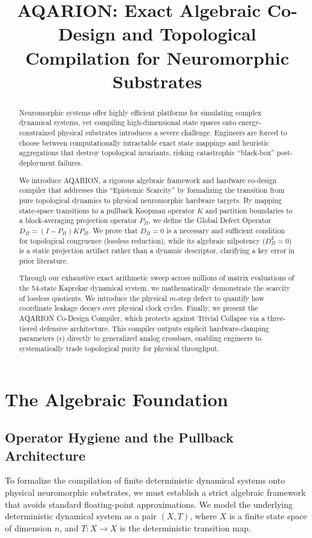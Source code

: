 \documentclass[10pt, conference]{IEEEtran}
\title{AQARION: Exact Algebraic Co-Design and Topological Compilation for Neuromorphic Substrates}
\author{
    \IEEEauthorblockN{Anonymous Authors}
    \IEEEauthorblockA{Submission to Neuromorphic Computing and Engineering (NCE)\\
    Artifact DOI: \href{https://doi.org/\aqarionDOI}{\aqarionDOI} | Verification: \aqarionLeanStatus}
}
\begin{document}
\maketitle

\begin{abstract}
Neuromorphic systems offer highly efficient platforms for simulating complex dynamical systems, yet compiling high-dimensional state spaces onto energy-constrained physical substrates introduces a severe challenge. Engineers are forced to choose between computationally intractable exact state mappings and heuristic aggregations that destroy topological invariants, risking catastrophic ``black-box'' post-deployment failures.

We introduce AQARION, a rigorous algebraic framework and hardware co-design compiler that addresses this ``Epistemic Scarcity'' by formalizing the transition from pure topological dynamics to physical neuromorphic hardware targets. By mapping state-space transitions to a pullback Koopman operator $K$ and partition boundaries to a block-averaging projection operator $P_\Pi$, we define the Global Defect Operator $D_\Pi = (I - P_\Pi) K P_\Pi$. We prove that $D_\Pi = 0$ is a necessary and sufficient condition for topological congruence (lossless reduction), while its algebraic nilpotency ($D_\Pi^2 = 0$) is a static projection artifact rather than a dynamic descriptor, clarifying a key error in prior literature.

Through our exhaustive exact arithmetic sweep across millions of matrix evaluations of the 54-state Kaprekar dynamical system, we mathematically demonstrate the scarcity of lossless quotients. We introduce the physical $m$-step defect to quantify how coordinate leakage decays over physical clock cycles. Finally, we present the AQARION Co-Design Compiler, which protects against Trivial Collapse via a three-tiered defensive architecture. This compiler outputs explicit hardware-clamping parameters ($\epsilon$) directly to generalized analog crossbars, enabling engineers to systematically trade topological purity for physical throughput.
\end{abstract}

\section{The Algebraic Foundation}
\subsection{Operator Hygiene and the Pullback Architecture}
To formalize the compilation of finite deterministic dynamical systems onto physical neuromorphic substrates, we must establish a strict algebraic framework that avoids standard floating-point approximations. We model the underlying deterministic dynamical system as a pair $(X, T)$, where $X$ is a finite state space of dimension $n$, and $T: X \to X$ is the deterministic transition map.
\end{document}
